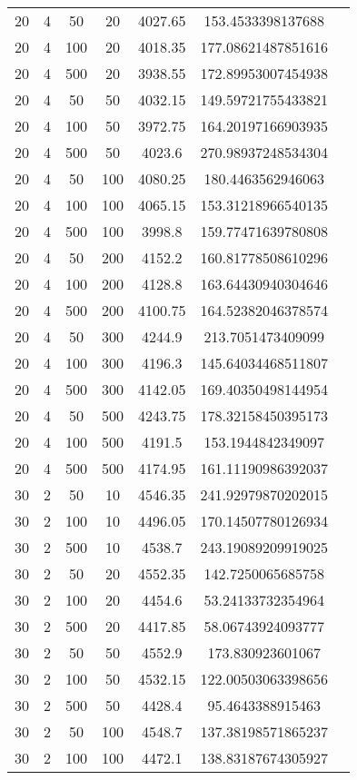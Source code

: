 {\begin{longtabu}{S
S
S
S
S
S[round-mode=places,round-precision=0]
S[round-mode=places,round-precision=0]}
20 & 4 & 50 & 20 & 4027.65 & 153.4533398137688 \\
20 & 4 & 100 & 20 & 4018.35 & 177.08621487851616 \\
20 & 4 & 500 & 20 & 3938.55 & 172.89953007454938 \\
20 & 4 & 50 & 50 & 4032.15 & 149.59721755433821 \\
20 & 4 & 100 & 50 & 3972.75 & 164.20197166903935 \\
20 & 4 & 500 & 50 & 4023.6 & 270.98937248534304 \\
20 & 4 & 50 & 100 & 4080.25 & 180.4463562946063 \\
20 & 4 & 100 & 100 & 4065.15 & 153.31218966540135 \\
20 & 4 & 500 & 100 & 3998.8 & 159.77471639780808 \\
20 & 4 & 50 & 200 & 4152.2 & 160.81778508610296 \\
20 & 4 & 100 & 200 & 4128.8 & 163.64430940304646 \\
20 & 4 & 500 & 200 & 4100.75 & 164.52382046378574 \\
20 & 4 & 50 & 300 & 4244.9 & 213.7051473409099 \\
20 & 4 & 100 & 300 & 4196.3 & 145.64034468511807 \\
20 & 4 & 500 & 300 & 4142.05 & 169.40350498144954 \\
20 & 4 & 50 & 500 & 4243.75 & 178.32158450395173 \\
20 & 4 & 100 & 500 & 4191.5 & 153.1944842349097 \\
20 & 4 & 500 & 500 & 4174.95 & 161.11190986392037 \\
30 & 2 & 50 & 10 & 4546.35 & 241.92979870202015 \\
30 & 2 & 100 & 10 & 4496.05 & 170.14507780126934 \\
30 & 2 & 500 & 10 & 4538.7 & 243.19089209919025 \\
30 & 2 & 50 & 20 & 4552.35 & 142.7250065685758 \\
30 & 2 & 100 & 20 & 4454.6 & 53.24133732354964 \\
30 & 2 & 500 & 20 & 4417.85 & 58.06743924093777 \\
30 & 2 & 50 & 50 & 4552.9 & 173.830923601067 \\
30 & 2 & 100 & 50 & 4532.15 & 122.00503063398656 \\
30 & 2 & 500 & 50 & 4428.4 & 95.4643388915463 \\
30 & 2 & 50 & 100 & 4548.7 & 137.38198571865237 \\
30 & 2 & 100 & 100 & 4472.1 & 138.83187674305927 \\

\end{longtabu}}
